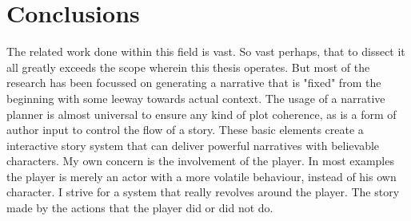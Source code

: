 \section{Conclusions}
The related work done within this field is vast.
So vast perhaps, that to dissect it all greatly exceeds the scope wherein this thesis operates.
But most of the research has been focussed on generating a narrative that is "fixed" from the beginning with some leeway towards actual context.
The usage of a narrative planner is almost universal to ensure any kind of plot coherence, as is a form of author input to control the flow of a story.
These basic elements create a interactive story system that can deliver powerful narratives with believable characters.
My own concern is the involvement of the player.
In most examples the player is merely an actor with a more volatile behaviour, instead of his own character.
I strive for a system that really revolves around the player.
The story made by the actions that the player did or did not do.





